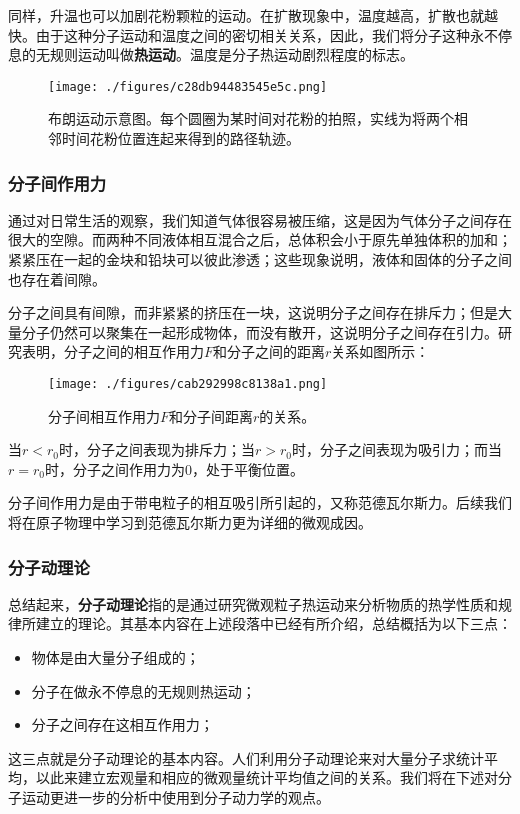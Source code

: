同样，升温也可以加剧花粉颗粒的运动。在扩散现象中，温度越高，扩散也就越快。由于这种分子运动和温度之间的密切相关关系，因此，我们将分子这种永不停息的无规则运动叫做\textbf{热运动}。温度是分子热运动剧烈程度的标志。
\begin{figure}[ht]
\centering
\texttt{[image: ./figures/c28db94483545e5c.png]}
\caption{布朗运动示意图。每个圆圈为某时间对花粉的拍照，实线为将两个相邻时间花粉位置连起来得到的路径轨迹。} \label{fig_thermo}
\end{figure}

\subsubsection{分子间作用力}
通过对日常生活的观察，我们知道气体很容易被压缩，这是因为气体分子之间存在很大的空隙。而两种不同液体相互混合之后，总体积会小于原先单独体积的加和；紧紧压在一起的金块和铅块可以彼此渗透；这些现象说明，液体和固体的分子之间也存在着间隙。

分子之间具有间隙，而非紧紧的挤压在一块，这说明分子之间存在排斥力；但是大量分子仍然可以聚集在一起形成物体，而没有散开，这说明分子之间存在引力。研究表明，分子之间的相互作用力$F$和分子之间的距离$r$关系如图所示：
\begin{figure}[ht]
\centering
\texttt{[image: ./figures/cab292998c8138a1.png]}
\caption{分子间相互作用力$F$和分子间距离$r$的关系。} \label{fig_thermo_fig2}
\end{figure}
当$r<r_0$时，分子之间表现为排斥力；当$r>r_0$时，分子之间表现为吸引力；而当$r=r_0$时，分子之间作用力为$0$，处于平衡位置。

分子间作用力是由于带电粒子的相互吸引所引起的，又称范德瓦尔斯力。后续我们将在原子物理中学习到范德瓦尔斯力更为详细的微观成因。
\subsubsection{分子动理论}
总结起来，\textbf{分子动理论}指的是通过研究微观粒子热运动来分析物质的热学性质和规律所建立的理论。其基本内容在上述段落中已经有所介绍，总结概括为以下三点：
\begin{itemize}
\item 物体是由大量分子组成的；
\item  分子在做永不停息的无规则热运动；
\item 分子之间存在这相互作用力；
\end{itemize}这三点就是分子动理论的基本内容。人们利用分子动理论来对大量分子求统计平均，以此来建立宏观量和相应的微观量统计平均值之间的关系。我们将在下述对分子运动更进一步的分析中使用到分子动力学的观点。

